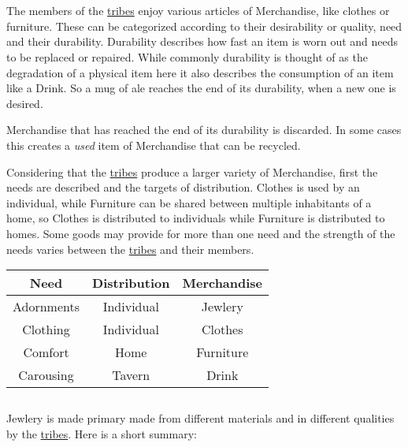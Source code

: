 \section{}\label{ch:Goods:Merchandise}

The members of the \hyperref[ch:Tribes]{tribes} enjoy various articles of
\gls*{Merchandise}, like clothes or furniture. These can be categorized
according to their desirability or quality, need and their durability.
Durability describes how fast an item is worn out and needs to be replaced or
repaired. While commonly durability is thought of as the degradation of a
physical item here it also describes the consumption of an item like a
\gls{Drink}. So a mug of ale reaches the end of its durability, when a new one
is desired.

\Gls{Merchandise} that has reached the end of its durability is discarded.
In some cases this creates a \emph{used} item of \gls{Merchandise} that can be recycled.

Considering that the \hyperref[ch:Tribes]{tribes} produce a larger variety of
\gls*{Merchandise}, first the needs are described and the targets of
distribution. \Gls{Clothes} is used by an individual, while \gls{Furniture} can
be shared between multiple inhabitants of a home, so \Gls{Clothes} is
distributed to individuals while \gls{Furniture} is distributed to homes. Some
goods may provide for more than one need and the strength of the needs varies
between the \hyperref[ch:Tribes]{tribes} and their members.

\begin{longtable}{ccc}
	\toprule
	Need             & Distribution & \Gls{Merchandise} \\
	\midrule
	\Gls{Adornments} & Individual   & \Gls{Jewlery}     \\
	\Gls{Clothing}   & Individual   & \Gls{Clothes}     \\
	\Gls{Comfort}    & Home         & \Gls{Furniture}   \\
	\Gls{Carousing}  & Tavern       & \Gls{Drink}       \\
	\bottomrule
\end{longtable}

\subsection{}\label{ch:Goods:Merchandise:Jewlery}

\Gls{Jewlery} is made primary made from different materials and in different qualities by the
\hyperref[ch:Tribes]{tribes}. Here is a short summary:


